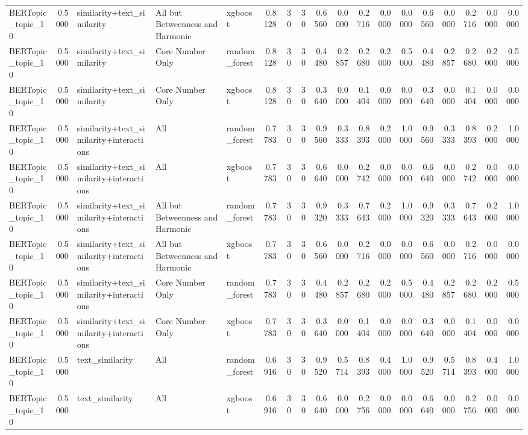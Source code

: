 \begin{tabular}{lrlllrrrrrrrrrrrrr}
BERTopic_topic_10 & 0.5000 & similarity+text_similarity & All but Betweenness and Harmonic & xgboost & 0.8128 & 30 & 30 & 0.6560 & 0.0000 & 0.2716 & 0.0000 & 0.0000 & 0.6560 & 0.0000 & 0.2716 & 0.0000 & 0.0000 \\
BERTopic_topic_10 & 0.5000 & similarity+text_similarity & Core Number Only & random_forest & 0.8128 & 30 & 30 & 0.4480 & 0.2857 & 0.2680 & 0.2000 & 0.5000 & 0.4480 & 0.2857 & 0.2680 & 0.2000 & 0.5000 \\
BERTopic_topic_10 & 0.5000 & similarity+text_similarity & Core Number Only & xgboost & 0.8128 & 30 & 30 & 0.3640 & 0.0000 & 0.1404 & 0.0000 & 0.0000 & 0.3640 & 0.0000 & 0.1404 & 0.0000 & 0.0000 \\
BERTopic_topic_10 & 0.5000 & similarity+text_similarity+interactions & All & random_forest & 0.7783 & 30 & 30 & 0.9560 & 0.3333 & 0.8393 & 0.2000 & 1.0000 & 0.9560 & 0.3333 & 0.8393 & 0.2000 & 1.0000 \\
BERTopic_topic_10 & 0.5000 & similarity+text_similarity+interactions & All & xgboost & 0.7783 & 30 & 30 & 0.6640 & 0.0000 & 0.2742 & 0.0000 & 0.0000 & 0.6640 & 0.0000 & 0.2742 & 0.0000 & 0.0000 \\
BERTopic_topic_10 & 0.5000 & similarity+text_similarity+interactions & All but Betweenness and Harmonic & random_forest & 0.7783 & 30 & 30 & 0.9320 & 0.3333 & 0.7643 & 0.2000 & 1.0000 & 0.9320 & 0.3333 & 0.7643 & 0.2000 & 1.0000 \\
BERTopic_topic_10 & 0.5000 & similarity+text_similarity+interactions & All but Betweenness and Harmonic & xgboost & 0.7783 & 30 & 30 & 0.6560 & 0.0000 & 0.2716 & 0.0000 & 0.0000 & 0.6560 & 0.0000 & 0.2716 & 0.0000 & 0.0000 \\
BERTopic_topic_10 & 0.5000 & similarity+text_similarity+interactions & Core Number Only & random_forest & 0.7783 & 30 & 30 & 0.4480 & 0.2857 & 0.2680 & 0.2000 & 0.5000 & 0.4480 & 0.2857 & 0.2680 & 0.2000 & 0.5000 \\
BERTopic_topic_10 & 0.5000 & similarity+text_similarity+interactions & Core Number Only & xgboost & 0.7783 & 30 & 30 & 0.3640 & 0.0000 & 0.1404 & 0.0000 & 0.0000 & 0.3640 & 0.0000 & 0.1404 & 0.0000 & 0.0000 \\
BERTopic_topic_10 & 0.5000 & text_similarity & All & random_forest & 0.6916 & 30 & 30 & 0.9520 & 0.5714 & 0.8393 & 0.4000 & 1.0000 & 0.9520 & 0.5714 & 0.8393 & 0.4000 & 1.0000 \\
BERTopic_topic_10 & 0.5000 & text_similarity & All & xgboost & 0.6916 & 30 & 30 & 0.6640 & 0.0000 & 0.2756 & 0.0000 & 0.0000 & 0.6640 & 0.0000 & 0.2756 & 0.0000 & 0.0000 \\

\end{tabular}
